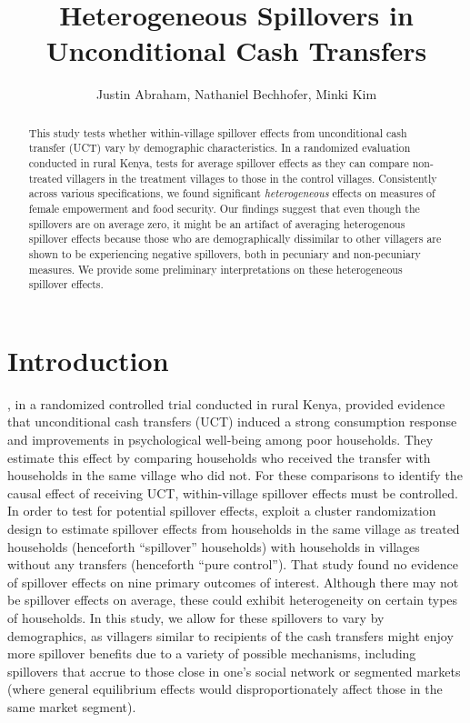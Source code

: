 \documentclass[11pt]{article}
\begin{document}
\title{Heterogeneous Spillovers in Unconditional Cash Transfers}

\author{
	Justin Abraham, Nathaniel Bechhofer, Minki Kim
}

\maketitle

	\begin{abstract}

     This study tests whether within-village spillover effects from unconditional cash transfer (UCT) vary by demographic characteristics. In a randomized evaluation conducted in rural Kenya, \textcite{haushofer_short-term_2016} tests for average spillover effects as they can compare non-treated villagers in the treatment villages to those in the control villages. Consistently across various specifications, we found significant \textit{heterogeneous} effects on measures of female empowerment and food security. Our findings suggest that even though the spillovers are on average zero, it might be an artifact of averaging heterogenous spillover effects because those who are demographically dissimilar to other villagers are shown to be experiencing negative spillovers, both in pecuniary and non-pecuniary measures. We provide some preliminary interpretations on these heterogeneous spillover effects.

 	\end{abstract}

\section{Introduction}

    \textcite{haushofer_short-term_2016}, in a randomized controlled trial conducted in rural Kenya, provided evidence that unconditional cash transfers (UCT) induced a strong consumption response and improvements in psychological well-being among poor households. They estimate this effect by comparing households who received the transfer with households in the same village who did not. For these comparisons to identify the causal effect of receiving UCT, within-village spillover effects must be controlled.
    In order to test for potential spillover effects, \textcite{haushofer_short-term_2016} exploit a cluster randomization design to estimate spillover effects from households in the same village as treated households (henceforth ``spillover'' households) with households in villages without any transfers (henceforth ``pure control''). That study found no evidence of spillover effects on nine primary outcomes of interest. Although there may not be spillover effects on average, these could exhibit heterogeneity on certain types of households. In this study, we allow for these spillovers to vary by demographics, as villagers similar to recipients of the cash transfers might enjoy more spillover benefits due to a variety of possible mechanisms, including spillovers that accrue to those close in one's social network or segmented markets (where general equilibrium effects would disproportionately affect those in the same market segment).
\end{document}
